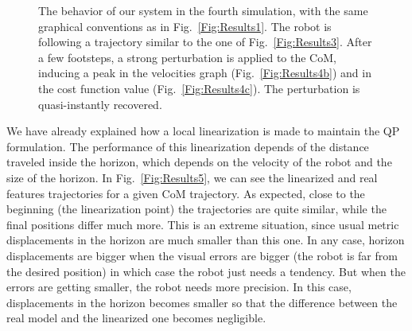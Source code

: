 \begin{figure}[ht]
{ \label{Fig:Results4b}
 }
 \caption[]{\label{Fig:Results4}\small{The behavior of our system in the fourth simulation, with the same graphical conventions as in Fig.~\ref{Fig:Results1}. The robot is following a trajectory similar to the one of Fig.~\ref{Fig:Results3}. After a few footsteps, a strong perturbation is applied to the CoM, inducing a peak in the velocities graph (Fig.~\ref{Fig:Results4b}) and in the cost function value (Fig.~\ref{Fig:Results4c}). The perturbation is quasi-instantly recovered.}}
 \end{figure}

We have already explained how a local linearization is made to maintain the QP formulation. The performance of this linearization depends of the distance traveled inside the horizon, which depends on the velocity of the robot and the size of the horizon. In Fig.~\ref{Fig:Results5}, we can see the linearized and real features trajectories for a given CoM trajectory. As expected, close to the beginning (the linearization point) the trajectories are quite similar, while the final positions differ much more. This is an extreme situation, since usual metric displacements in the horizon are much smaller than this one. In any case, horizon displacements are bigger when the visual errors are bigger (the robot is far from the desired position) in which case the robot just needs a tendency. But when the errors are getting smaller, the robot needs more precision. In this case, displacements in the horizon becomes smaller so that the difference between the real model and the linearized one becomes negligible.

